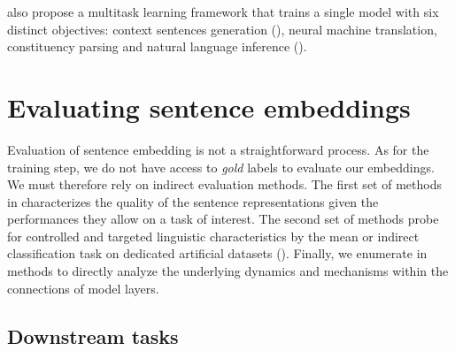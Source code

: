 \textcite{subramanian_18} also propose a multitask learning framework that trains a single model with six distinct objectives: context sentences generation (), neural machine translation, constituency parsing and natural language inference ().

\section{Evaluating sentence embeddings}

Evaluation of sentence embedding is not a straightforward process. As for the training step, we do not have access to \textit{gold} labels to evaluate our embeddings. We must therefore rely on indirect evaluation methods. The first set of methods in  characterizes the quality of the sentence representations given the performances they allow on a task of interest. The second set of methods probe for controlled and targeted linguistic characteristics by the mean or indirect classification task on dedicated artificial datasets (). Finally, we enumerate in  methods to directly analyze the underlying dynamics and mechanisms within the connections of model layers.

\subsection{Downstream tasks}

